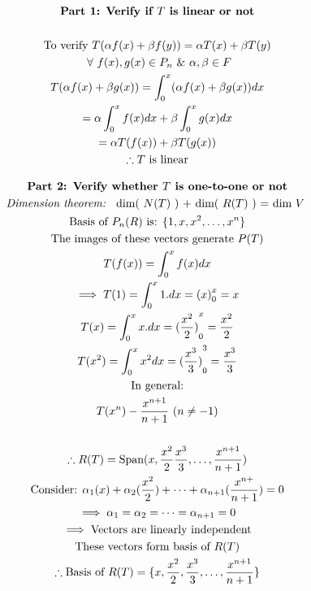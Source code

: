 \documentclass[english,course,fleqn]{lecture}
\newenvironment{qanda}{\begin{enumerate}\setlength{\parindent}{0pt}}{\medskip\end{enumerate}}
\begin{document}
\begin{qanda}
  \begin{gather*}
    \text{\textbf{Part 1: Verify if $T$ is linear or not}}\\
    \\
    \text{To verify $T(\alpha f(x) + \beta f(y)) = \alpha T(x) + \beta T(y)$}\\
    ~\forall~ f(x), g(x) \in P_{n} ~\&~ \alpha, \beta \in F\\
    T(\alpha f(x) + \beta g(x)) = \int_{0}^{x} (\alpha f(x) + \beta g(x)) dx\\
    = \alpha \int_{0}^{x}f(x)dx + \beta \int_{0}^{x}g(x) dx\\
    = \alpha T(f(x)) + \beta T(g(x))\\
    \therefore \text{$T$ is linear}
  \end{gather*}

  \begin{gather*}
    \text{\textbf{Part 2: Verify whether $T$ is one-to-one or not}}\\
  \text{\textit{Dimension theorem: } dim( $N(T)$ ) + dim( $R(T)$ ) = dim $V$ }\\
  \text{Basis of $P_{n}(R)$ is: }\{1, x, x^{2}, \ldots, x^{n}\}\\
  \text{The images of these vectors generate $P(T)$}\\
  T(f(x)) = \int_{0}^{x}f(x)dx\\
  \implies T(1) =  \int_{0}^{x} 1.dx = {(x)}_{0}^{x} = x\\
  T(x) = \int_{0}^{x}x.dx  = {(\frac{x^{2}}{2})}^{x}_{0} = \frac{x^{2}}{2}\\
  T(x^{2}) = \int_{0}^{x} x^{2} dx = {(\frac{x^{3}}{3})}^{3}_{0} = \frac{x^{3}}{3}\\
  \text{In general:}\\
  T(x^{n}) - \frac{x^{n + 1}}{n + 1}~(n \ne -1)\\
  \\
  \therefore R(T) = \text{Span}(x, \frac{x^{2}}{2} \frac{x^{3}}{3}, \ldots, \frac{x^{n+1}}{n+1})\\
  \text{Consider: }\alpha_{1}(x) + \alpha _{2}(\frac{x^{2}}{2}) + \cdots + \alpha_{n+1}(\frac{x^{n+}}{n+1}) = 0\\ 
  \implies \alpha_{1} = \alpha_{2} = \cdots = \alpha_{n+1} = 0\\
  \implies \text{Vectors are linearly independent}\\
  \text{These vectors form basis of $R(T)$}\\
  \therefore \text{Basis of $R(T)$} = \{x, \frac{x^{2}}{2}, \frac{x^{3}}{3}, \ldots, \frac{x^{n+1}}{n+1}\}\\
  \end{gather*}


\end{qanda}
\end{document}

